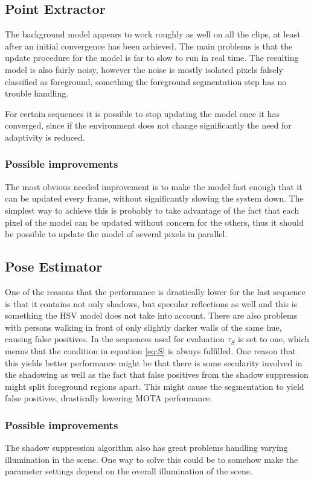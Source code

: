 
\subsection{Point Extractor}
The background model appears to work roughly as well on all the clips, at least after an initial convergence has been achieved. The main problems is that the update procedure for the model is far to slow to run in real time. The resulting model is also fairly noisy, however the noise is mostly isolated pixels falsely classified as foreground, something the foreground segmentation step has no trouble handling.

For certain sequences it is possible to stop updating the model once it has converged, since if the environment does not change significantly the need for adaptivity is reduced.

\subsubsection{Possible improvements}
The most obvious needed improvement is to make the model fast enough that it can be updated every frame, without significantly slowing the system down. The simplest way to achieve this is probably to take advantage of the fact that each pixel of the model can be updated without concern for the others, thus it should be possible to update the model of several pixels in parallel.

\subsection{Pose Estimator}
One of the reasons that the performance is drastically lower for the last sequence is that it contains not only shadows, but specular reflections as well and this is something the HSV model does not take into account. There are also problems with persons walking in front of only slightly darker walls of the same hue, causing false positives. In the sequences used for evaluation $\tau_S$ is set to one, which means that the condition in equation \eqref{eq:S} is always fulfilled. One reason that this yields better performance might be that there is some secularity involved in the shadowing as well as the fact that false positives from the shadow suppression might split foreground regions apart. This might cause the segmentation to yield false positives, drastically lowering MOTA performance.

\subsubsection{Possible improvements}
The shadow suppression algorithm also has great problems handling varying illumination in the scene. One way to solve this could be to somehow make the parameter settings depend on the overall illumination of the scene. 


